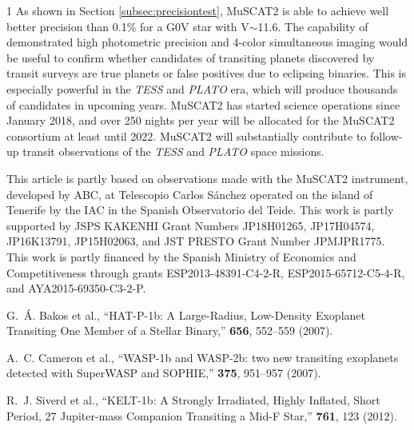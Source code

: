 \documentclass[a4paper,12pt]{spieman}  %
\begin{document}
\begin{spacing}{1}
As shown in Section \ref{subsec:precisiontest}, MuSCAT2 is able to achieve well better precision
than 0.1\% for a G0V star with V$\sim$11.6.
The capability of demonstrated high photometric precision and 4-color simultaneous imaging
would be useful to confirm whether candidates of transiting planets
discovered by transit surveys are true planets or false positives due to eclipsing binaries.
This is especially powerful in the {\it TESS} and {\it PLATO} era, which will produce
thousands of candidates in upcoming years.
MuSCAT2 has started science operations since January 2018, and
over 250 nights per year will be allocated for the MuSCAT2 consortium at least until 2022.
MuSCAT2 will substantially contribute to follow-up transit observations of
the {\it TESS} and {\it PLATO} space missions.  

\acknowledgments 

This article is partly based on observations made with the MuSCAT2 instrument,
developed by ABC, at Telescopio Carlos S\'anchez operated on the island of Tenerife
by the IAC in the Spanish Observatorio del Teide.
This work is partly supported by JSPS KAKENHI Grant Numbers
JP18H01265, JP17H04574, JP16K13791, JP15H02063,
and JST PRESTO Grant Number JPMJPR1775.
This work is partly financed by the Spanish Ministry of Economics and Competitiveness
through grants ESP2013-48391-C4-2-R,
ESP2015-65712-C5-4-R, and AYA2015-69350-C3-2-P.



\begin{thebibliography}{}

G.~{\'A}. {Bakos} et al., ``{HAT-P-1b: A Large-Radius, Low-Density Exoplanet Transiting One
  Member of a Stellar Binary},'' {\em \apj} {\bf 656}, 552--559  (2007).

A.~C. {Cameron} et al., ``{WASP-1b
  and WASP-2b: two new transiting exoplanets detected with SuperWASP and
  SOPHIE},'' {\em \mnras} {\bf 375}, 951--957  (2007).

R.~J. {Siverd} et al.,  ``{KELT-1b: A Strongly Irradiated, Highly Inflated, Short Period, 27
  Jupiter-mass Companion Transiting a Mid-F Star},'' {\em \apj} {\bf 761}, 123
  (2012).


\end{thebibliography}
\end{spacing}
\end{document}
